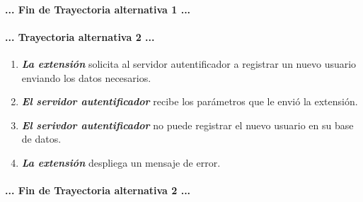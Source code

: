\documentclass[12pt, a4paper, titlepage]{report}
\begin{document}
    		\paragraph{... Fin de Trayectoria alternativa 1 ...}
		
    		\paragraph{... Trayectoria alternativa 2 ...}
    		\begin{enumerate}
    		    \item \textbf{\textit{La extensión}} solicita al servidor autentificador a registrar un nuevo usuario enviando los datos necesarios.
    		    
    		    \item \textbf{\textit{El servidor autentificador}} recibe los parámetros que le envió la extensión.
    		    
    		    \item \textbf{\textit{El serivdor autentificador}} no puede registrar el nuevo usuario en su base de datos.
    		    
    		    \item \textbf{\textit{La extensión}} despliega un mensaje de error.
    		\end{enumerate}
    		\paragraph{... Fin de Trayectoria alternativa 2 ...}
    		\newpage
		
		
		
\end{document}
